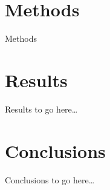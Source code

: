 \documentclass{article}
\begin{document}
\section{Methods}
Methods

\section{Results}
Results to go here\ldots

\section{Conclusions}
Conclusions to go here\ldots

\printbibliography[filter=practical2]
\end{document}
